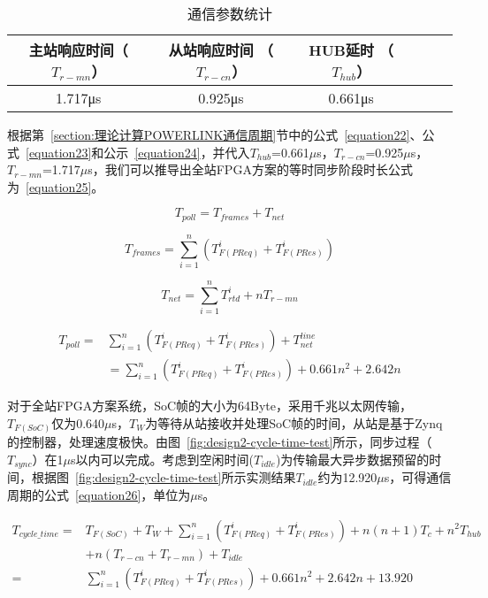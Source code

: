 \begin{table}[hbt]
	\centering
	\caption{通信参数统计}
	\begin{tabular}{cccccc}
		\toprule
		主站响应时间（$T_{r-mn}$） & 从站响应时间 （$T_{r-cn}$）& HUB延时 （$T_{hub}$）\\
		\midrule
		1.717μs & 0.925μs & 0.661μs\\
		\bottomrule
	\end{tabular}
	\label{table:3.2}
\end{table}


根据第~\ref{section:理论计算POWERLINK通信周期}节中的公式~\ref{equation22}、公式~\ref{equation23}和公示~\ref{equation24}，并代入$T_{hub}$=0.661$\mu$s，$T_{r-cn}$=0.925$\mu$s，$T_{r-mn}$=1.717$\mu$s，我们可以推导出全站FPGA方案的等时同步阶段时长公式为~\ref{equation25}。

\begin{equation}
\label{equation22}
T_{poll}=T_{frames}+T_{net}
\end{equation}

\begin{equation}
\label{equation23}
T_{frames}=\sum_{i=1}^n(T_{F(PReq)}^{i}+T_{F(PRes)}^{i})
\end{equation}

\begin{equation}
\label{equation24}
T_{net}=\sum_{i=1}^nT_{rtd}^{i}+nT_{r-mn}
\end{equation}

\begin{equation}
\begin{split}
\label{equation25}
T_{poll}=&\sum_{i=1}^n(T_{F(PReq)}^{i}+T_{F(PRes)}^{i})+T_{net}^{line}\\
&=\sum_{i=1}^n(T_{F(PReq)}^{i}+T_{F(PRes)}^{i})+0.661n^{2}+2.642n
\end{split}
\end{equation}

对于全站FPGA方案系统，SoC帧的大小为64Byte，采用千兆以太网传输，$T_{F(SoC)}$仅为0.640$\mu$s，$T_{W}$为等待从站接收并处理SoC帧的时间，从站是基于Zynq的控制器，处理速度极快。由图~\ref{fig:design2-cycle-time-test}所示，同步过程（$T_{sync}$）在1$\mu$s以内可以完成。考虑到空闲时间($T_{idle}$)为传输最大异步数据预留的时间，根据图~\ref{fig:design2-cycle-time-test}所示实测结果$T_{idle}$约为12.920$\mu$s，可得通信周期的公式~\ref{equation26}，单位为$\mu$s。

\begin{equation}
\label{equation26}
\begin{split}
T_{cycle\_time}=&T_{F(SoC)}+T_{W}+\sum_{i=1}^n(T_{F(PReq)}^{i}+T_{F(PRes)}^{i})+n(n+1)T_{c}+n^2T_{hub}\\
& + n(T_{r-cn}+T_{r-mn})+T_{idle}\\
=&\sum_{i=1}^n(T_{F(PReq)}^{i}+T_{F(PRes)}^{i})+0.661n^{2}+2.642n+13.920
\end{split}
\end{equation}

